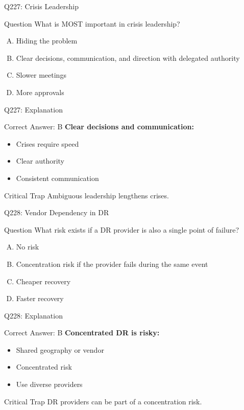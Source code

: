 \documentclass{beamer}
\begin{document}
	\begin{frame}{Q227: Crisis Leadership}
		\begin{block}{Question}
			What is MOST important in crisis leadership?
		\end{block}
		\begin{enumerate}[(A)]
			\item Hiding the problem
			\item Clear decisions, communication, and direction with delegated authority
			\item Slower meetings
			\item More approvals
		\end{enumerate}
	\end{frame}
	
	\begin{frame}{Q227: Explanation}
		\begin{block}{Correct Answer: B}
			\textbf{Clear decisions and communication:}
			\begin{itemize}
				\item Crises require speed
				\item Clear authority
				\item Consistent communication
			\end{itemize}
		\end{block}
		\begin{alertblock}{Critical Trap}
			Ambiguous leadership lengthens crises.
		\end{alertblock}
	\end{frame}
	
	\begin{frame}{Q228: Vendor Dependency in DR}
		\begin{block}{Question}
			What risk exists if a DR provider is also a single point of failure?
		\end{block}
		\begin{enumerate}[(A)]
			\item No risk
			\item Concentration risk if the provider fails during the same event
			\item Cheaper recovery
			\item Faster recovery
		\end{enumerate}
	\end{frame}
	
	\begin{frame}{Q228: Explanation}
		\begin{block}{Correct Answer: B}
			\textbf{Concentrated DR is risky:}
			\begin{itemize}
				\item Shared geography or vendor
				\item Concentrated risk
				\item Use diverse providers
			\end{itemize}
		\end{block}
		\begin{alertblock}{Critical Trap}
			DR providers can be part of a concentration risk.
		\end{alertblock}
	\end{frame}
	
\end{document}
